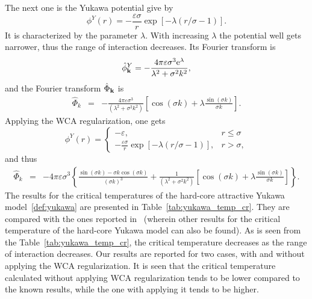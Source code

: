 The next one is the Yukawa potential give by 
\begin{equation}
	\label{def:yukawa}
	\phi^Y(r) = -\frac{\varepsilon \sigma}{r} \exp[-\lambda(r/\sigma - 1)].
\end{equation}
It is characterized by the parameter $\lambda$. With increasing $\lambda$ the potential well gets narrower, thus the range of interaction decreases.
Its Fourier transform is
\begin{equation*}
	\hat{\phi}^Y_{\vb k} = -\frac{4\pi \varepsilon \sigma^3 {\rm e}^{\lambda}}{\lambda^2 + \sigma^2 k^2},
\end{equation*}
and the Fourier transform $\hat{\Phi}_{\vb k}$ is
\begin{eqnarray*}
	\label{eq:part_yukawa_fourier}
	\hat{\Phi}_k & = & -\frac{4\pi \varepsilon\sigma^3}{(\lambda^2 + \sigma^2 k^2)}
	\left[\cos(\sigma k) + \lambda \frac{\sin(\sigma k)}{\sigma k} \right].
\end{eqnarray*}
Applying the WCA regularization, one gets
\begin{equation}
	\label{def:yukawa_wca}
	\phi^Y(r) = \left\{
	\begin{array}{ll}
		-\varepsilon, & r \leq \sigma 
		\\
		-\frac{\varepsilon \sigma}{r} \exp[-\lambda(r/\sigma - 1)], & r > \sigma,
	\end{array}
	\right.
\end{equation}
and thus
\begin{eqnarray*}
	\label{eq:wca_yukawa_fourier}
	\hat{\Phi}_k & = & -4\pi \varepsilon\sigma^3 \left\{ 
	\frac{\sin(\sigma k) - \sigma k \cos(\sigma k)}{(\sigma k)^3}
	+\frac{1}{(\lambda^2 + \sigma^2 k^2)}
	\left[\cos(\sigma k) + \lambda \frac{\sin(\sigma k)}{\sigma k} \right]
	\right\}.
\end{eqnarray*}
The results for the critical temperatures of the hard-core attractive Yukawa model~\eqref{def:yukawa} are presented in Table~\ref{tab:yukawa_temp_cr}. They are compared with the ones reported in~\cite{MendoubWaxJakse2010} (wherein other results for the critical temperature of the hard-core Yukawa model can also be found). As is seen from the Table~\ref{tab:yukawa_temp_cr}, the critical temperature decreases as the range of interaction decreases. Our results are reported for two cases, with and without applying the WCA regularization. It is seen that the critical temperature calculated without applying WCA regularization tends to be lower compared to the known results, while the one with applying it tends to be higher.

